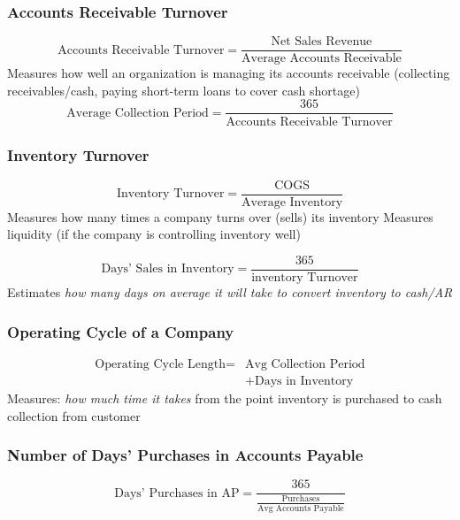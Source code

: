 \documentclass{article}
\begin{document}
\begin{multicols}{2}
\subsubsection{Accounts Receivable Turnover}
$$\text{Accounts Receivable Turnover} = \frac{\text{Net Sales Revenue}}{\text{Average Accounts Receivable}}$$
Measures how well an organization is managing its accounts receivable (collecting receivables/cash, paying short-term loans to cover cash shortage)
$$\text{Average Collection Period} = \frac{365}{\text{Accounts Receivable Turnover}}$$



\subsubsection{Inventory Turnover}
$$\text{Inventory Turnover} = \frac{\text{COGS}}{\text{Average Inventory}}$$
Measures how many times a company turns over (sells) its inventory
Measures liquidity (if the company is controlling inventory well)

$$\text{Days' Sales in Inventory} = \frac{365}{\text{inventory Turnover}}$$
Estimates \textit{how many days on average it will take to convert inventory to cash/AR}

\subsubsection{Operating Cycle of a Company}
\begin{equation*}
	\begin{aligned}
		\text{Operating Cycle Length} = & \text{Avg Collection Period} \\&+ \text{Days in Inventory}
	\end{aligned}
\end{equation*}
Measures: \textit{how much time it takes} from the point inventory is purchased to cash collection from customer

\subsubsection{Number of Days' Purchases in Accounts Payable}
$$\text{Days' Purchases in AP} = \frac{365}{\frac{\text{Purchases}}{\text{Avg Accounts Payable}}}$$


\end{multicols}
\end{document}
